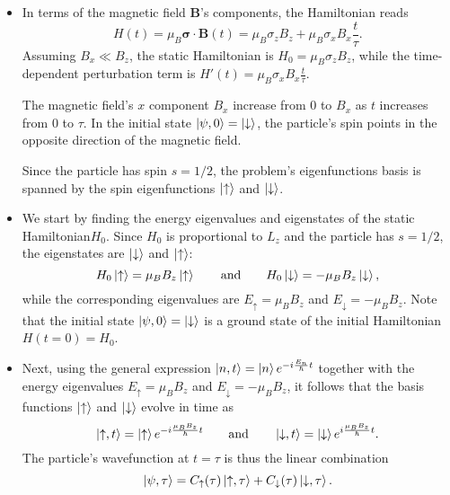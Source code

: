 \documentclass[11pt, a4paper]{article}
\newcommand{\eqtext}[1]{\qquad \text{#1} \qquad}
\newcommand{\Ham}{Hamiltonian\xspace}
\renewcommand{\vec}[1]{\bm{#1}} %
\newcommand{\p}{\psi}  %
\newcommand{\ua}{\uparrow}  %
\newcommand{\da}{\downarrow}  %
\begin{document}
\begin{itemize}

	\item In terms of the magnetic field $ \vec{B} $'s components, the \Ham reads
	\begin{equation*}
		H(t) = \mu_{B}\vec{\sigma}\cdot \vec{B}(t) = \mu_{B}\sigma_{z}B_{z} + \mu_{B}\sigma_{x}B_{x}\frac{t}{\tau}.
	\end{equation*}
	Assuming $ B_{x} \ll B_{z} $, the static \Ham is $ H_{0} = \mu_{B}\sigma_{z}B_{z} $, while the time-dependent perturbation term is $ H'(t) = \mu_{B}\sigma_{x}B_{x}\frac{t}{\tau} $.
	
	The magnetic field's $ x $ component $ B_{x} $ increase from $ 0 $ to $ B_{x} $ as $ t $ increases from $ 0  $ to $ \tau $. In the initial state $ \ket{\p, 0} = \ket{\da} $, the particle's spin points in the opposite direction of the magnetic field. 
	
	Since the particle has spin $ s = 1/2 $, the problem's eigenfunctions basis is spanned by the spin eigenfunctions $ \ket{\ua} $ and $ \ket{\da} $.


	\item We start by finding the energy eigenvalues and eigenstates of the static \Ham $ H_{0} $. Since $ H_{0} $ is proportional to $ L_{z} $ and the particle has $ s = 1/2 $, the eigenstates are $ \ket{\da} $ and $ \ket{\ua} $:
	\begin{equation*}
		H_{0}\ket{\ua} = \mu_{B}B_{z} \ket{\ua} \eqtext{and} H_{0}\ket{\da} = -\mu_{B}B_{z} \ket{\da},
	\end{equation*}
	while the corresponding eigenvalues are $ E_{\ua} = \mu_{B}B_{z} $ and $ E_{\da} = -\mu_{B}B_{z} $. Note that the initial state $ \ket{\p, 0} = \ket{\da} $ is a ground state of the initial Hamiltonian $ H(t = 0) = H_{0} $. 
	
	\item Next, using the general expression $ \ket{n, t} = \ket{n} e^{-i\frac{E_{n}}{\hbar}t} $ together with the energy eigenvalues $ E_{\ua} = \mu_{B}B_{z} $ and $ E_{\da} = -\mu_{B}B_{z} $, it follows that the basis functions $ \ket{\ua} $ and $ \ket{\da} $ evolve in time as
	\begin{equation*}
		\ket{\ua, t} = \ket{\ua} e^{-i\frac{\mu_{B}B_{z}}{\hbar}t} \eqtext{and} \ket{\da, t} = \ket{\da} e^{i\frac{\mu_{B}B_{z}}{\hbar}t}.
	\end{equation*}
	The particle's wavefunction at $ t = \tau $ is thus the linear combination
	\begin{equation*}
		\ket{\p, \tau} = C_{\ua}(\tau) \ket{\ua, \tau} +  C_{\da}(\tau) \ket{\da, \tau}.
	\end{equation*}
	

\end{itemize}
\end{document}
